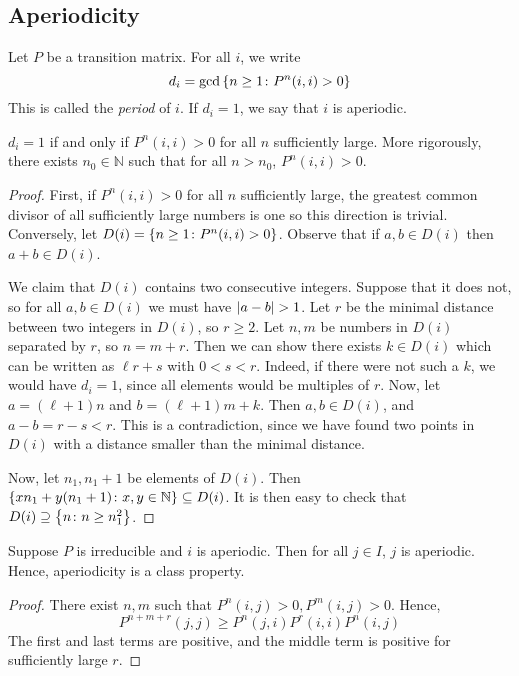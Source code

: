 \subsection{Aperiodicity}
\begin{definition}
	Let \( P \) be a transition matrix.
	For all \( i \), we write
	\[
		d_i = \gcd\qty{n \geq 1 \colon P^n(i,i) > 0}
	\]
	This is called the \textit{period} of \( i \).
	If \( d_i = 1 \), we say that \( i \) is aperiodic.
\end{definition}
\begin{lemma}
	\( d_i = 1 \) if and only if \( P^n(i,i) > 0 \) for all \( n \) sufficiently large.
	More rigorously, there exists \( n_0 \in \mathbb N \) such that for all \( n > n_0 \), \( P^n(i,i) > 0 \).
\end{lemma}
\begin{proof}
	First, if \( P^n(i,i)>0 \) for all \( n \) sufficiently large, the greatest common divisor of all sufficiently large numbers is one so this direction is trivial.
	Conversely, let \( D(i) = \qty{n \geq 1 \colon P^n(i,i) > 0} \).
	Observe that if \( a, b \in D(i) \) then \( a + b \in D(i) \).

	We claim that \( D(i) \) contains two consecutive integers.
	Suppose that it does not, so for all \( a, b \in D(i) \) we must have \( \abs{a-b} > 1 \).
	Let \( r \) be the minimal distance between two integers in \( D(i) \), so \( r \geq 2 \).
	Let \( n, m \) be numbers in \( D(i) \) separated by \( r \), so \( n = m + r \).
	Then we can show there exists \( k \in D(i) \) which can be written as \( \ell r + s \) with \( 0 < s < r \).
	Indeed, if there were not such a \( k \), we would have \( d_i = 1 \), since all elements would be multiples of \( r \).
	Now, let \( a = (\ell + 1)n \) and \( b = (\ell+1)m + k \).
	Then \( a, b \in D(i) \), and \( a-b = r-s < r \).
	This is a contradiction, since we have found two points in \( D(i) \) with a distance smaller than the minimal distance.

	Now, let \( n_1, n_1 + 1 \) be elements of \( D(i) \).
	Then \( \qty{x n_1 + y(n_1 + 1) \colon x,y \in \mathbb N } \subseteq D(i) \).
	It is then easy to check that \( D(i) \supseteq \qty{n \colon n \geq n_1^2} \).
\end{proof}
\begin{lemma}
	Suppose \( P \) is irreducible and \( i \) is aperiodic.
	Then for all \( j \in I \), \( j \) is aperiodic.
	Hence, aperiodicity is a class property.
\end{lemma}
\begin{proof}
	There exist \( n, m \) such that \( P^n(i,j) > 0, P^m(i,j) > 0 \).
	Hence,
	\[
		P^{n+m+r}(j,j) \geq P^n(j,i) P^r(i,i) P^n(i,j)
	\]
	The first and last terms are positive, and the middle term is positive for sufficiently large \( r \).
\end{proof}

